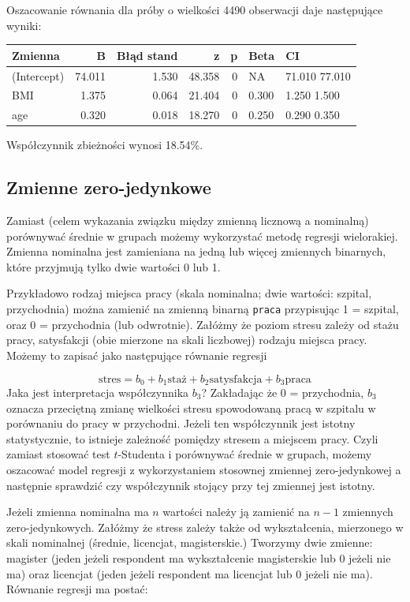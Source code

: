 \documentclass[
  openany]{book}
\begin{document}
\begin{example}
Oszacowanie równania dla próby o wielkości 4490 obserwacji daje następujące
wyniki:

\begin{tabular}{l|r|r|r|r|l|l}
\hline
Zmienna & B & Błąd stand & z & p & Beta & CI\\
\hline
(Intercept) & 74.011 & 1.530 & 48.358 & 0 & NA & 71.010 77.010\\
\hline
BMI & 1.375 & 0.064 & 21.404 & 0 & 0.300 & 1.250 1.500\\
\hline
age & 0.320 & 0.018 & 18.270 & 0 & 0.250 & 0.290 0.350\\
\hline
\end{tabular}

Współczynnik zbieżności wynosi 18.54\%.
\end{example}

\hypertarget{zmienne-zero-jedynkowe}{%
\subsection{Zmienne zero-jedynkowe}\label{zmienne-zero-jedynkowe}}

Zamiast (celem wykazania związku między zmienną licznową a nominalną) porównywać
średnie w grupach możemy wykorzystać metodę regresji
wielorakiej. Zmienna nominalna jest zamieniana na jedną lub więcej
zmiennych binarnych, które przyjmują tylko dwie wartości 0 lub 1.

Przykładowo rodzaj miejsca pracy (skala nominalna; dwie wartości: szpital, przychodnia)
można zamienić na zmienną binarną \texttt{praca} przypisując 1 = szpital, oraz
0 = przychodnia (lub odwrotnie). Załóżmy że poziom stresu zależy od stażu pracy, satysfakcji
(obie mierzone na skali liczbowej)
rodzaju miejsca pracy. Możemy to zapisać jako następujące równanie regresji

\[\textrm{stres} = b_0 + b_1\textrm{staż} + b_2 \textrm{satysfakcja} + b_3 \textrm{praca}\]
Jaka jest interpretacja współczynnika \(b_3\)? Zakładając że 0 = przychodnia, \(b_3\) oznacza
przeciętną zmianę wielkości stresu
spowodowaną pracą w szpitalu w porównaniu do pracy w przychodni. Jeżeli ten współczynnik jest istotny
statystycznie, to istnieje zależność pomiędzy stresem a miejscem pracy. Czyli zamiast
stosować test \(t\)-Studenta i porównywać średnie w grupach,
możemy oszacować model regresji z wykorzystaniem stosownej
zmiennej zero-jedynkowej a następnie sprawdzić czy współczynnik stojący przy tej zmiennej jest istotny.

Jeżeli zmienna nominalna ma \(n\) wartości należy ją zamienić na \(n-1\) zmiennych zero-jedynkowych.
Załóżmy że stress zależy także od wykształcenia, mierzonego w skali nominalnej
(średnie, licencjat, magisterskie.) Tworzymy dwie zmienne:
magister (jeden jeżeli respondent ma wykształcenie magisterskie lub 0 jeżeli nie ma)
oraz licencjat (jeden jeżeli respondent ma licencjat lub 0 jeżeli nie ma). Równanie
regresji ma postać:
\end{document}
